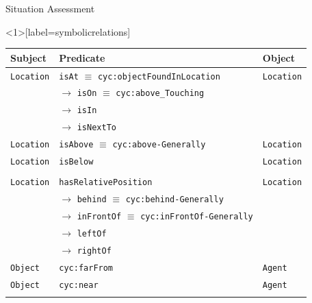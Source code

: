 \documentclass[compress]{beamer}
\newcommand{\concept}[1]{{\scriptsize \texttt{#1}}}
\begin{document}
{
\begin{frame}{Situation Assessment}
        \centering
        \\


\end{frame}
}


{
\begin{frame}<1>[label=symbolicrelations]{}
        \centering
        \scriptsize

        \begin{tabular}{p{1.5cm}lp{2cm}}
            Subject & Predicate  & Object  \\ 
            \hline
            \concept{Location} & \concept{isAt} $\equiv$ \concept{cyc:objectFoundInLocation}  &  \concept{Location}  \\ 
                               &  $\rightarrow$ \concept{isOn} $\equiv$ \concept{cyc:above\_Touching}  &   \\ 
                               &  $\rightarrow$ \concept{isIn}  &   \\ 
                               &  $\rightarrow$ \concept{isNextTo}  &   \\ 

            \concept{Location}  & \concept{isAbove} $\equiv$ \concept{cyc:above-Generally}  &  \concept{Location} \\ 
            \concept{Location}  & \concept{isBelow}  & \concept{Location} \\
            \onslide<2>{\\\hline
            \concept{Location}  & \concept{hasRelativePosition}  & \concept{Location}  \\ 
                                   & 	$\rightarrow$ \concept{behind} $\equiv$ \concept{cyc:behind-Generally}  & \\ 
                                      &  $\rightarrow$ \concept{inFrontOf} $\equiv$ \concept{cyc:inFrontOf-Generally}  & \\ 
                                         &  $\rightarrow$ \concept{leftOf}  &  \\ 
                                            &  $\rightarrow$ \concept{rightOf}  & 	 \\ 
            \concept{Object}  & \concept{cyc:farFrom}  &  \concept{Agent} \\ 
            \concept{Object}  & \concept{cyc:near}  &  \concept{Agent} \\

}
\end{tabular}
\end{frame}}
\end{document}
